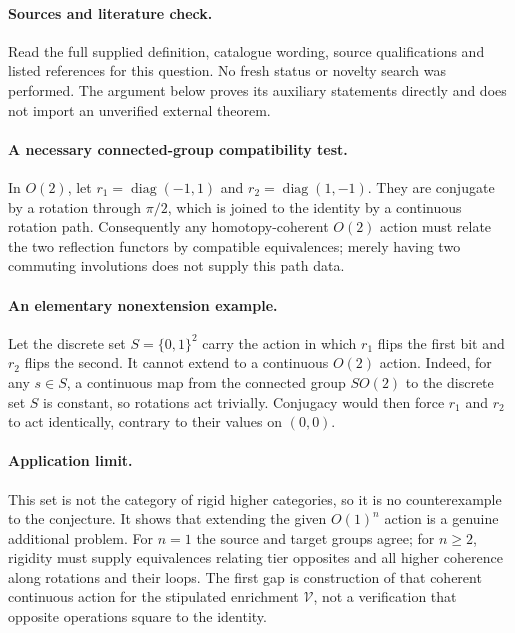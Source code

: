 \documentclass[11pt]{article}
\begin{document}
\paragraph{Sources and literature check.}
Read the full supplied definition, catalogue wording, source qualifications and listed references for this question. No fresh status or novelty search was performed. The argument below proves its auxiliary statements directly and does not import an unverified external theorem.

\paragraph{A necessary connected-group compatibility test.} In \(O(2)\), let \(r_1=\operatorname{diag}(-1,1)\) and \(r_2=\operatorname{diag}(1,-1)\). They are conjugate by a rotation through \(\pi/2\), which is joined to the identity by a continuous rotation path. Consequently any homotopy-coherent \(O(2)\) action must relate the two reflection functors by compatible equivalences; merely having two commuting involutions does not supply this path data.
\paragraph{An elementary nonextension example.} Let the discrete set \(S=\{0,1\}^2\) carry the action in which \(r_1\) flips the first bit and \(r_2\) flips the second. It cannot extend to a continuous \(O(2)\) action. Indeed, for any \(s\in S\), a continuous map from the connected group \(SO(2)\) to the discrete set \(S\) is constant, so rotations act trivially. Conjugacy would then force \(r_1\) and \(r_2\) to act identically, contrary to their values on \((0,0)\).
\paragraph{Application limit.} This set is not the category of rigid higher categories, so it is no counterexample to the conjecture. It shows that extending the given \(O(1)^n\) action is a genuine additional problem. For \(n=1\) the source and target groups agree; for \(n\geq2\), rigidity must supply equivalences relating tier opposites and all higher coherence along rotations and their loops. The first gap is construction of that coherent continuous action for the stipulated enrichment \(\mathcal V\), not a verification that opposite operations square to the identity.
\end{document}
